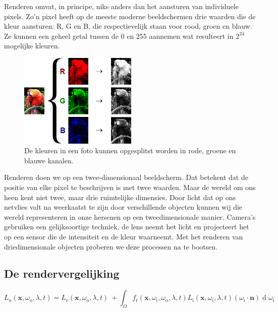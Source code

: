 \documentclass[12pt, a4paper]{article}
\begin{document}
Renderen omvat, in principe, niks anders dan het aansturen van individuele pixels. Zo'n pixel heeft op de meeste moderne beeldschermen drie waarden die de kleur aansturen: R, G en B, die respectievelijk staan voor rood, groen en blauw. Ze kunnen een geheel getal tussen de 0 en 255 aannemen wat resulteert in \(2^{24}\) mogelijke kleuren.
\begin{figure}[H]
\centering
\includegraphics[width=0.5\textwidth]{RGB_channels_separation.png}
\caption{De kleuren in een foto kunnen opgesplitst worden in rode, groene en blauwe kanalen.}
\label{fig:rgb_separated}
\end{figure}

Renderen doen we op een twee-dimensionaal beeldscherm. Dat betekent dat de positie van elke pixel te beschrijven is met twee waarden. Maar de wereld om ons heen kent niet twee, maar drie ruimtelijke dimensies. Door licht dat op ons netvlies valt na weerkaatst te zijn door verschillende objecten kunnen wij die wereld representeren in onze hersenen op een tweedimensionale manier. Camera's gebruiken een gelijksoortige techniek, de lens neemt het licht en projecteert het op een sensor die de intensiteit en de kleur waarneemt. Met het renderen van driedimensionale objecten proberen we deze processen na te bootsen. 

\subsection{De rendervergelijking}
\[
L_{\text{o}}(\mathbf x, \omega_{\text{o}}, \lambda, t) = L_{\text{e}}(\mathbf x, \omega_{\text{o}}, \lambda, t) \ + \int_\Omega f_{\text{r}}(\mathbf x, \omega_{\text{i}}, \omega_{\text{o}}, \lambda, t) L_{\text{i}}(\mathbf x, \omega_{\text{i}}, \lambda, t) (\omega_{\text{i}}\cdot\mathbf n) \operatorname d \omega_{\text{i}}
\]
\end{document}
